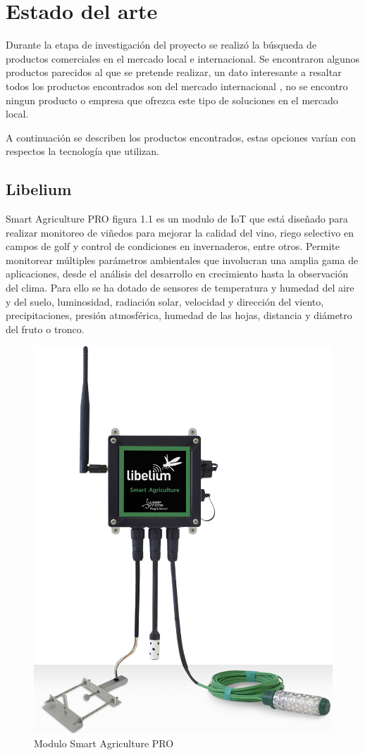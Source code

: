 \section{Estado del arte}

Durante la etapa de investigación del proyecto se realizó la búsqueda de productos comerciales en el mercado local e internacional.
Se encontraron algunos productos parecidos al que se pretende realizar, un dato interesante a resaltar todos los productos encontrados son del mercado internacional , no se encontro ningun producto o empresa que ofrezca este tipo de soluciones
en el mercado local.

A continuación se describen los productos encontrados, estas opciones varían con respectos la tecnología que utilizan.

\subsection{Libelium}

Smart Agriculture PRO figura 1.1 es un modulo de IoT que está diseñado para realizar monitoreo de viñedos para mejorar la calidad del vino, riego selectivo en campos de golf y control de condiciones en invernaderos, entre otros.
Permite monitorear múltiples parámetros ambientales que involucran una amplia gama de aplicaciones, desde el análisis del desarrollo en crecimiento hasta la observación del clima. Para ello se ha dotado de sensores de temperatura y humedad del aire y del suelo, luminosidad, radiación solar, velocidad y dirección del viento, precipitaciones, presión atmosférica, humedad de las hojas, distancia y diámetro del fruto o tronco.
\vspace{1cm}

\begin{figure}[htbp]
	\centering
	\includegraphics[width=.4\textwidth]{./Figures/modulo_libelium.png}
	\caption{Modulo Smart Agriculture PRO}
	\label{fig:texmaker}
\end{figure}

